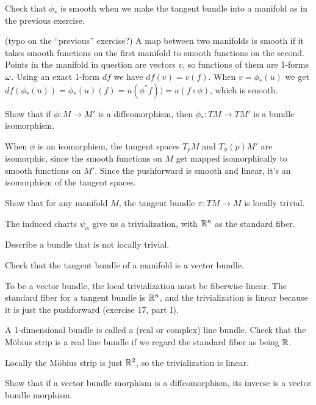 \begin{p}%
{Check that $\phi_*$ is smooth when we make the tangent bundle into a manifold as in the previous exercise.}
\end{p}
{(typo on the ``previous'' exercise?) A map between two manifolds is smooth if it takes smooth functions on the first manifold to smooth functions on the second. Points in the manifold in 
question are vectors $v$, so functions of them are 1-forms $\omega$. Using an exact 1-form $df$ we have
$df(v)=v(f)$. When $v=\phi_*(u)$ we get $df(\phi_*(u))=\phi_*(u)(f)=u(\phi^*f))=u(f\circ\phi)$, which is 
smooth.}

\begin{p}%
{Show that if $\phi:M\rightarrow M'$ is a diffeomorphism, then $\phi_*:TM\rightarrow TM'$ is a bundle isomorphism.}
\end{p}
{When $\phi$ is an isomorphism, the tangent spaces $T_pM$ and $T_\phi(p)M'$ are 
isomorphic, since the smooth functions on $M$ get mapped isomorphically to smooth functions on $M'$. Since
the pushforward is smooth and linear, it's an isomorphism of the tangent spaces.}

\begin{p}%
{Show that for any manifold $M$, the tangent bundle $\pi:TM\rightarrow M$ is locally trivial.}
\end{p}
{The induced charts $\psi_\alpha$ give us a trivialization, with $\mathbb{R}^n$ as the standard fiber.}

\begin{p}%
{Describe a bundle that is not locally trivial.}
\end{p}
{}

\begin{p}%
{Check that the tangent bundle of a manifold is a vector bundle.}
\end{p}
{To be a vector bundle, the 
local trivialization must be fiberwise linear. The standard fiber for a tangent bundle is $\mathbb{R}^n$, and the  
trivialization is linear because it is just the pushforward (exercise 17, part I).}

\begin{p}%
{A 1-dimensional bundle is called a (real or complex) line bundle. Check that the M\"obius strip is a real line bundle if we regard the standard fiber as being $\mathbb{R}$.}
\end{p}
{Locally the M\"obius strip is just $\mathbb{R}^2$, so the trivialization is linear.}

\begin{p}%
{Show that if a vector bundle morphism is a diffeomorphism, its inverse is a vector bundle morphism.}
\end{p}
{}

